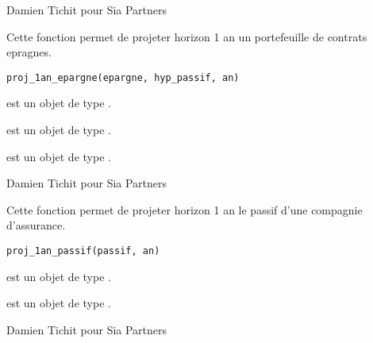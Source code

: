 \documentclass[a4paper]{book}
\begin{document}
%
\begin{Author}\relax
Damien Tichit pour Sia Partners
\end{Author}
%
\begin{Description}\relax
Cette fonction permet de projeter horizon 1 an un portefeuille de contrats epragnes.
\end{Description}
%
\begin{Usage}
\begin{verbatim}
proj_1an_epargne(epargne, hyp_passif, an)
\end{verbatim}
\end{Usage}
%
\begin{Arguments}
\begin{ldescription}
\item[\code{epargne}] est un objet de type .

\item[\code{hyp\_passif}] est un objet de type .

\item[\code{an}] est un objet de type .
\end{ldescription}
\end{Arguments}
%
\begin{Author}\relax
Damien Tichit pour Sia Partners
\end{Author}
%
\begin{Description}\relax
Cette fonction permet de projeter horizon 1 an le passif d'une compagnie d'assurance.
\end{Description}
%
\begin{Usage}
\begin{verbatim}
proj_1an_passif(passif, an)
\end{verbatim}
\end{Usage}
%
\begin{Arguments}
\begin{ldescription}
\item[\code{passif}] est un objet de type .

\item[\code{an}] est un objet de type .
\end{ldescription}
\end{Arguments}
%
\begin{Author}\relax
Damien Tichit pour Sia Partners
\end{Author}
\end{document}
